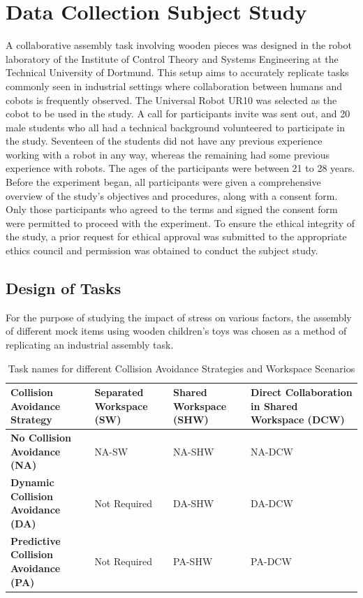 \chapter{Data Collection Subject Study}

A collaborative assembly task involving wooden pieces was designed in the robot laboratory of the Institute of Control Theory and Systems Engineering at the Technical University of Dortmund. This setup aims to accurately replicate tasks commonly seen in industrial settings where collaboration between humans and cobots is frequently observed. The Universal Robot UR10 was selected as the cobot to be used in the study. A call for participants invite was sent out, and 20 male students who all had a technical background volunteered to participate in the study. Seventeen of the students did not have any previous experience working with a robot in any way, whereas the remaining
had some previous experience with robots. The ages of the participants were between 21 to 28 years. Before the experiment began, all participants were given a comprehensive overview of the study's objectives and procedures, along with a consent form. Only those participants who agreed to the terms and signed the consent form were permitted to proceed with the experiment. To ensure the ethical integrity of the study, a prior request for ethical approval was submitted to the appropriate ethics council and permission was obtained to conduct the subject study.

\section{Design of Tasks}
For the purpose of studying the impact of stress on various factors, the assembly of different mock items using wooden children's toys was chosen as a method of replicating an industrial assembly task.

\begin{table}[h]
    \centering
    \renewcommand{\arraystretch}{2}
    \begin{tabular}{|p{3cm}|p{3cm}|p{3cm}|p{5cm}|}
    \hline
    \textbf{Collision Avoidance Strategy} & \textbf{Separated Workspace (SW)} & \textbf{Shared Workspace (SHW)} & \textbf{Direct Collaboration in Shared Workspace (DCW)} \\ \hline
    \textbf{No Collision Avoidance (NA)} & NA-SW & NA-SHW & NA-DCW \\ \hline
    \textbf{Dynamic Collision Avoidance (DA)} & Not Required & DA-SHW & DA-DCW \\ \hline
    \textbf{Predictive Collision Avoidance (PA)} & Not Required & PA-SHW & PA-DCW \\ \hline
    \end{tabular}
    \caption{Task names for different Collision Avoidance Strategies and Workspace Scenarios}
    \label{table:tasks}
\end{table}


